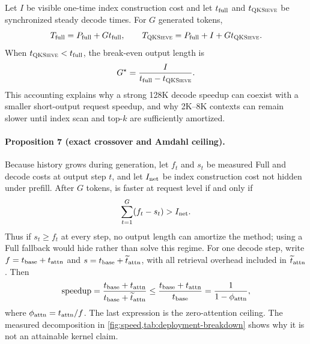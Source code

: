 Let $I$ be visible one-time index construction cost and let
$t_{\rm full}$ and $t_{\textsc{QKSieve}}$ be synchronized steady decode times.
For $G$ generated tokens,
\begin{equation}
 T_{\rm full}=P_{\rm full}+Gt_{\rm full},\qquad
 T_{\textsc{QKSieve}}=P_{\rm full}+I+Gt_{\textsc{QKSieve}}.
 \label{eq:request-cost}
\end{equation}
When $t_{\textsc{QKSieve}}<t_{\rm full}$, the break-even output length is
\begin{equation}
 G^\star=\frac{I}{t_{\rm full}-t_{\textsc{QKSieve}}}.
 \label{eq:break-even}
\end{equation}
This accounting explains why a strong 128K decode speedup can coexist with a
smaller short-output request speedup, and why 2K--8K contexts can remain
slower until index scan and top-$k$ are sufficiently amortized.

\paragraph{Proposition 7 (exact crossover and Amdahl ceiling).}
Because history grows during generation, let $f_t$ and $s_t$ be measured
Full and \method decode costs at output step $t$, and let $I_{\rm net}$ be
index construction cost not hidden under prefill.  After $G$ tokens,
\method is faster at request level if and only if
\begin{equation}
 \sum_{t=1}^{G}(f_t-s_t)>I_{\rm net}.
 \label{eq:exact-break-even}
\end{equation}
Thus if $s_t\ge f_t$ at every step, no output length can amortize the method;
using a Full fallback would hide rather than solve this regime.
For one decode step, write
$f=t_{\rm base}+t_{\rm attn}$ and
$s=t_{\rm base}+\widetilde t_{\rm attn}$, with all retrieval overhead
included in $\widetilde t_{\rm attn}$.  Then
\begin{equation}
 \mathrm{speedup}=
 \frac{t_{\rm base}+t_{\rm attn}}
      {t_{\rm base}+\widetilde t_{\rm attn}}
 \le
 \frac{t_{\rm base}+t_{\rm attn}}{t_{\rm base}}
 =\frac{1}{1-\phi_{\rm attn}},
 \label{eq:amdahl-ceiling}
\end{equation}
where $\phi_{\rm attn}=t_{\rm attn}/f$.
The last expression is the zero-attention ceiling.  The measured decomposition
in \cref{fig:speed,tab:deployment-breakdown} shows why it is not an attainable
kernel claim.

